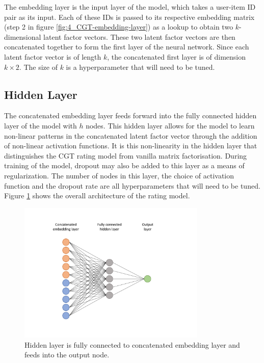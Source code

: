 The embedding layer is the input layer of the model, which takes a user-item ID pair as its input. Each of these IDs is passed to its respective embedding matrix (step 2 in figure \ref{fig:4_CGT-embedding-layer}) as a lookup to obtain two $k$-dimensional latent factor vectors. These two latent factor vectors are then concatenated together to form the first layer of the neural network. Since each latent factor vector is of length $k$, the concatenated first layer is of dimension $k\times2$. The size of $k$ is a hyperparameter that will need to be tuned.

\subsection{Hidden Layer}
The concatenated embedding layer feeds forward into the fully connected hidden layer of the model with $h$ nodes. This hidden layer allows for the model to learn non-linear patterns in the concatenated latent factor vector through the addition of non-linear activation functions. It is this non-linearity in the hidden layer that distinguishes the CGT rating model from vanilla matrix factorisation. During training of the model, dropout may also be added to this layer as a means of regularization. The number of nodes in this layer, the choice of activation function and the dropout rate are all hyperparameters that will need to be tuned. Figure \ref{fig:4_CGT-hidden-layer} shows the overall architecture of the rating model.

\begin{figure}[H]
\centering
\includegraphics[width=0.8\textwidth]{Figures/4_CGT-hidden.pdf}
\decoRule
\caption[Rating model hidden layer]{Hidden layer is fully connected to concatenated embedding layer and feeds into the output node.}
\label{fig:4_CGT-hidden-layer}
\end{figure}

